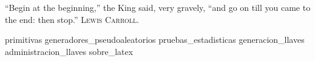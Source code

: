 %
%
%

\newpage
{}
{}
{
  \epigrafe
  {%
    ``Begin at the beginning,'' the King said, very gravely, ``and go on till
    you came to the end: then stop.''%
  }
  {%
    \textsc{Lewis Carroll}.%
  }
}

\begin{appendices}
  {primitivas}
  {generadores_pseudoaleatorios}
  {pruebas_estadisticas}
  {generacion_llaves}
  {administracion_llaves}
  {sobre_latex}
\end{appendices}

\newpage
